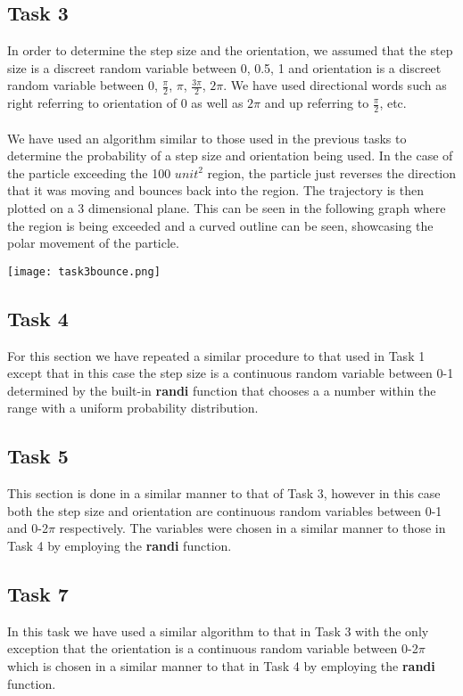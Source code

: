 \documentclass{article}
\begin{document}
\subsection{Task 3}
In order to determine the step size and the orientation, we assumed that the step size is a discreet random variable between {0, 0.5, 1} and orientation is a discreet random variable between {0, $\frac{\pi}{2}$, $\pi$, $\frac{3\pi}{2}$, $2\pi$}. We have used directional words such as right referring to orientation of 0 as well as $2\pi$ and up referring to $\frac{\pi}{2}$, etc. 
\\\\
We have used an algorithm similar to those used in the previous tasks to determine the probability of a step size and orientation being used. In the case of the particle exceeding the 100 $unit^{2}$ region, the particle just reverses the direction that it was moving and bounces back into the region. The trajectory is then plotted on a 3 dimensional plane. This can 
be seen in the following graph where the region is being exceeded and a curved outline can be seen, showcasing the polar movement of the particle.
\begin{center}
    \texttt{[image: task3bounce.png]}
\end{center}
\subsection{Task 4}
For this section we have repeated a similar procedure to that used in Task 1 except that in this case the step size is a continuous random variable between 0-1 determined by the built-in \textbf{randi} function that chooses a a number within the range with a uniform probability distribution.
\subsection{Task 5}
This section is done in a similar manner to that of Task 3, however in this case both the step size and orientation are continuous random variables between 0-1 and 0-2$\pi$ respectively. The variables were chosen in a similar manner to those in Task 4 by employing the \textbf{randi} function.
\subsection{Task 7}
In this task we have used a similar algorithm to that in Task 3 with the only exception that the orientation is a continuous random variable between 0-2$\pi$ which is chosen in a similar manner to that in Task 4 by employing the \textbf{randi} function. 
\end{document}

